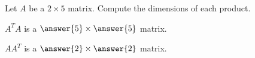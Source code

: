 \documentclass{ximera}
\author{Anna Davis}
\begin{document}
\begin{exercise}
Let $A$ be a $2\times 5$ matrix.  Compute the dimensions of each product.

$A^TA$ is a $\answer{5}\times \answer{5}$ matrix.

$AA^T$ is a $\answer{2}\times \answer{2}$ matrix.

 \end{exercise}
 
\end{document}
